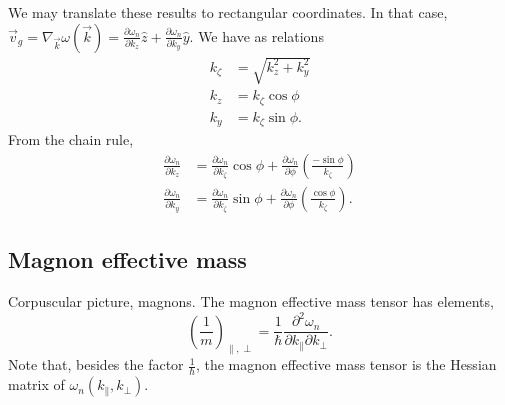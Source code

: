 \documentclass{article}
\begin{document}
We may translate these results to rectangular coordinates. In that case, $\vec{v}_{g} = \nabla_{\vec{k}} \omega (\vec{k}) = \frac{\partial \omega_{n}}{\partial k_{z}} \hat{z} + \frac{\partial \omega_{n}}{\partial k_{y}} \hat{y}$. We have as relations
\begin{align}
k_{\zeta} &= \sqrt{k_{z}^2 + k_{y}^2} \\
k_{z} &= k_{\zeta} \cos{\phi} \\
k_{y} &= k_{\zeta} \sin{\phi}.
\end{align}
From the chain rule,
\begin{align}
\frac{\partial \omega_{n}}{\partial k_{z}} &= \frac{\partial \omega_{n}}{\partial k_{\zeta}} \cos{\phi} + \frac{\partial \omega_{n}}{\partial \phi} \left(\frac{-\sin{\phi}}{k_{\zeta}}\right) \\
\frac{\partial \omega_{n}}{\partial k_{y}} &= \frac{\partial \omega_{n}}{\partial k_{\zeta}} \sin{\phi} + \frac{\partial \omega_{n}}{\partial \phi} \left(\frac{\cos{\phi}}{k_{\zeta}}\right).
\end{align}

\subsection{Magnon effective mass}
Corpuscular picture, magnons. The magnon effective mass tensor has elements,
\begin{equation}
\left(\frac{1}{m}\right)_{\parallel , \perp} = \frac{1}{\hbar} \frac{\partial^2 \omega_{n}}{\partial k_{\parallel} \partial k_{\perp}}.
\end{equation}
Note that, besides the factor $\frac{1}{\hbar}$, the magnon effective mass tensor is the Hessian matrix of $\omega_{n} ( k_{\parallel} , k_{\perp} )$.
\end{document}

